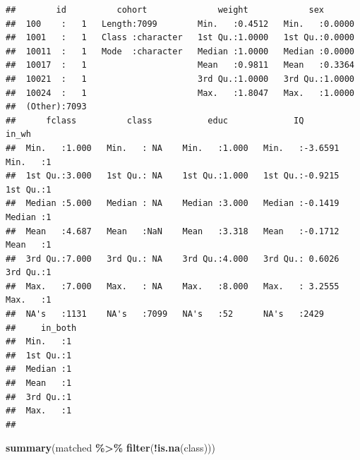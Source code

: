 \documentclass[
]{article}
\newenvironment{Shaded}{\begin{snugshade}}{\end{snugshade}}
\newcommand{\FunctionTok}[1]{\textcolor[rgb]{0.13,0.29,0.53}{\textbf{#1}}}
\newcommand{\NormalTok}[1]{#1}
\newcommand{\SpecialCharTok}[1]{\textcolor[rgb]{0.81,0.36,0.00}{\textbf{#1}}}
\begin{document}
\begin{verbatim}
##        id          cohort              weight            sex        
##  100    :   1   Length:7099        Min.   :0.4512   Min.   :0.0000  
##  1001   :   1   Class :character   1st Qu.:1.0000   1st Qu.:0.0000  
##  10011  :   1   Mode  :character   Median :1.0000   Median :0.0000  
##  10017  :   1                      Mean   :0.9811   Mean   :0.3364  
##  10021  :   1                      3rd Qu.:1.0000   3rd Qu.:1.0000  
##  10024  :   1                      Max.   :1.8047   Max.   :1.0000  
##  (Other):7093                                                       
##      fclass          class           educ             IQ              in_wh  
##  Min.   :1.000   Min.   : NA    Min.   :1.000   Min.   :-3.6591   Min.   :1  
##  1st Qu.:3.000   1st Qu.: NA    1st Qu.:1.000   1st Qu.:-0.9215   1st Qu.:1  
##  Median :5.000   Median : NA    Median :3.000   Median :-0.1419   Median :1  
##  Mean   :4.687   Mean   :NaN    Mean   :3.318   Mean   :-0.1712   Mean   :1  
##  3rd Qu.:7.000   3rd Qu.: NA    3rd Qu.:4.000   3rd Qu.: 0.6026   3rd Qu.:1  
##  Max.   :7.000   Max.   : NA    Max.   :8.000   Max.   : 3.2555   Max.   :1  
##  NA's   :1131    NA's   :7099   NA's   :52      NA's   :2429                 
##     in_both 
##  Min.   :1  
##  1st Qu.:1  
##  Median :1  
##  Mean   :1  
##  3rd Qu.:1  
##  Max.   :1  
## 
\end{verbatim}

\begin{Shaded}
\begin{Highlighting}[]
\FunctionTok{summary}\NormalTok{(matched }\SpecialCharTok{\%\textgreater{}\%} \FunctionTok{filter}\NormalTok{(}\SpecialCharTok{!}\FunctionTok{is.na}\NormalTok{(class)))}
\end{Highlighting}
\end{Shaded}
\end{document}
